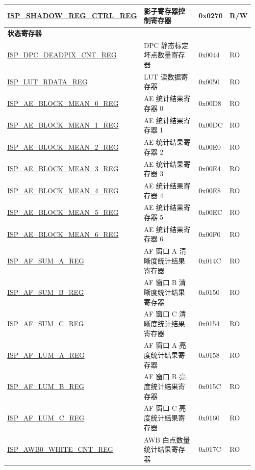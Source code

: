 \begin{longtable}{ | p{6cm} | p{7.2cm} | p{1.3cm} | p{1cm} | }
\hyperref[regdesc:ISPSHADOWREGCTRLREG]{ISP\_SHADOW\_REG\_CTRL\_REG} & 影子寄存器控制寄存器 & 0x0270 & R/W \\ \hline
\multicolumn{4}{|l|}{\textbf{状态寄存器}} \\ \hline
\hyperref[regdesc:ISPDPCDEADPIXCNTREG]{ISP\_DPC\_DEADPIX\_CNT\_REG} & DPC 静态标定坏点数量寄存器 & 0x0044 & RO \\ \hline
\hyperref[regdesc:ISPLUTRDATAREG]{ISP\_LUT\_RDATA\_REG} & LUT 读数据寄存器 & 0x0050 & RO \\ \hline
\hyperref[regdesc:ISPAEBLOCKMEAN0REG]{ISP\_AE\_BLOCK\_MEAN\_0\_REG} & AE 统计结果寄存器 0 & 0x00D8 & RO \\ \hline
\hyperref[regdesc:ISPAEBLOCKMEAN1REG]{ISP\_AE\_BLOCK\_MEAN\_1\_REG} & AE 统计结果寄存器 1 & 0x00DC & RO \\ \hline
\hyperref[regdesc:ISPAEBLOCKMEAN2REG]{ISP\_AE\_BLOCK\_MEAN\_2\_REG} & AE 统计结果寄存器 2 & 0x00E0 & RO \\ \hline
\hyperref[regdesc:ISPAEBLOCKMEAN3REG]{ISP\_AE\_BLOCK\_MEAN\_3\_REG} & AE 统计结果寄存器 3 & 0x00E4 & RO \\ \hline
\hyperref[regdesc:ISPAEBLOCKMEAN4REG]{ISP\_AE\_BLOCK\_MEAN\_4\_REG} & AE 统计结果寄存器 4 & 0x00E8 & RO \\ \hline
\hyperref[regdesc:ISPAEBLOCKMEAN5REG]{ISP\_AE\_BLOCK\_MEAN\_5\_REG} & AE 统计结果寄存器 5 & 0x00EC & RO \\ \hline
\hyperref[regdesc:ISPAEBLOCKMEAN6REG]{ISP\_AE\_BLOCK\_MEAN\_6\_REG} & AE 统计结果寄存器 6 & 0x00F0 & RO \\ \hline
\hyperref[regdesc:ISPAFSUMAREG]{ISP\_AF\_SUM\_A\_REG} & AF 窗口 A 清晰度统计结果寄存器 & 0x014C & RO \\ \hline
\hyperref[regdesc:ISPAFSUMBREG]{ISP\_AF\_SUM\_B\_REG} & AF 窗口 B 清晰度统计结果寄存器 & 0x0150 & RO \\ \hline
\hyperref[regdesc:ISPAFSUMCREG]{ISP\_AF\_SUM\_C\_REG} & AF 窗口 C 清晰度统计结果寄存器 & 0x0154 & RO \\ \hline
\hyperref[regdesc:ISPAFLUMAREG]{ISP\_AF\_LUM\_A\_REG} & AF 窗口 A 亮度统计结果寄存器 & 0x0158 & RO \\ \hline
\hyperref[regdesc:ISPAFLUMBREG]{ISP\_AF\_LUM\_B\_REG} & AF 窗口 B 亮度统计结果寄存器 & 0x015C & RO \\ \hline
\hyperref[regdesc:ISPAFLUMCREG]{ISP\_AF\_LUM\_C\_REG} & AF 窗口 C 亮度统计结果寄存器 & 0x0160 & RO \\ \hline
\hyperref[regdesc:ISPAWB0WHITECNTREG]{ISP\_AWB0\_WHITE\_CNT\_REG} & AWB 白点数量统计结果寄存器 & 0x017C & RO \\ \hline

\end{longtable}
